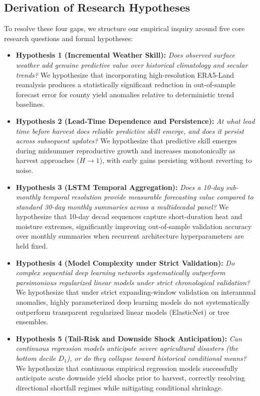 \subsection{Derivation of Research Hypotheses}
\label{sec:lit_hypotheses}
To resolve these four gaps, we structure our empirical inquiry around five core research questions and formal hypotheses:
\begin{itemize}
    \item \textbf{Hypothesis 1 (Incremental Weather Skill):} \textit{Does observed surface weather add genuine predictive value over historical climatology and secular trends?} We hypothesize that incorporating high-resolution ERA5-Land reanalysis produces a statistically significant reduction in out-of-sample forecast error for county yield anomalies relative to deterministic trend baselines.
    \item \textbf{Hypothesis 2 (Lead-Time Dependence and Persistence):} \textit{At what lead time before harvest does reliable predictive skill emerge, and does it persist across subsequent updates?} We hypothesize that predictive skill emerges during midsummer reproductive growth and increases monotonically as harvest approaches ($H \to 1$), with early gains persisting without reverting to noise.
    \item \textbf{Hypothesis 3 (LSTM Temporal Aggregation):} \textit{Does a 10-day sub-monthly temporal resolution provide measurable forecasting value compared to standard 30-day monthly summaries across a multidecadal panel?} We hypothesize that 10-day decad sequences capture short-duration heat and moisture extremes, significantly improving out-of-sample validation accuracy over monthly summaries when recurrent architecture hyperparameters are held fixed.
    \item \textbf{Hypothesis 4 (Model Complexity under Strict Validation):} \textit{Do complex sequential deep learning networks systematically outperform parsimonious regularized linear models under strict chronological validation?} We hypothesize that under strict expanding-window validation on interannual anomalies, highly parameterized deep learning models do not systematically outperform transparent regularized linear models (ElasticNet) or tree ensembles.
    \item \textbf{Hypothesis 5 (Tail-Risk and Downside Shock Anticipation):} \textit{Can continuous regression models anticipate severe agricultural disasters (the bottom decile $D_1$), or do they collapse toward historical conditional means?} We hypothesize that continuous empirical regression models successfully anticipate acute downside yield shocks prior to harvest, correctly resolving directional shortfall regimes while mitigating conditional shrinkage.
\end{itemize}
